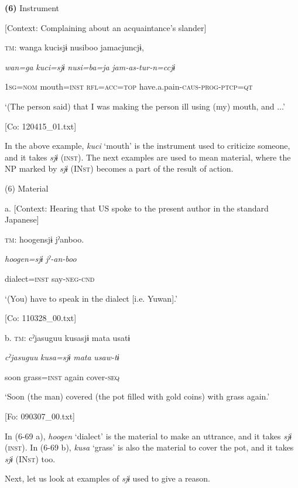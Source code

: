 \textbf{(6)}  Instrument

  [Context: Complaining about an acquaintance’s slander]

  \textsc{tm}:  wanga  kucisjɨ  nusiboo  jamacjuncjɨ,

    \textit{wan=ga}  \textit{kuci=sjɨ}  \textit{nusi=ba=ja}  \textit{jam-as-tur-n=ccjɨ}

    1\textsc{sg}=\textsc{nom}  mouth=\textsc{inst}  \textsc{rfl}=\textsc{acc}=\textsc{top}  have.a.pain-\textsc{caus}-\textsc{prog}-\textsc{ptcp}=\textsc{qt}

    ‘(The person\textit{\textsubscript{} }said) that I was making the person ill using (my) mouth, and ...’

    [Co: 120415\_01.txt]

In the above example, \textit{kuci} ‘mouth’ is the instrument used to criticize someone, and it takes \textit{sjɨ} (\textsc{inst}). The next examples are used to mean material, where the NP marked by \textit{sjɨ} (IN\textsc{st}) becomes a part of the result of action.

(6)  Material

  a.  [Context: Hearing that US spoke to the present author in the standard Japanese]

    \textsc{tm}:  {\textbar}hoogen{\textbar}sjɨ  jˀanboo.

      \textit{hoogen=sjɨ}  \textit{jˀ-an-boo}

      dialect=\textsc{inst}  say-\textsc{neg}-\textsc{cnd}

      ‘(You) have to speak in the dialect [i.e. Yuwan].’

      [Co: 110328\_00.txt]

  b.  \textsc{tm}:  cˀjasuguu  kusasjɨ  mata  usatɨ

      \textit{cˀjasuguu}  \textit{kusa=sjɨ}  \textit{mata}  \textit{usaw-tɨ}

      soon  grass=\textsc{inst}  again  cover-\textsc{seq}

      ‘Soon (the man) covered (the pot filled with gold coins) with grass again.’

      [Fo: 090307\_00.txt]

In (6-69 a), \textit{hoogen} ‘dialect’ is the material to make an uttrance, and it takes \textit{sjɨ} (\textsc{inst}). In (6-69 b), \textit{kusa} ‘grass’ is also the material to cover the pot, and it takes \textit{sjɨ} (IN\textsc{st}) too.

Next, let us look at examples of \textit{sjɨ} used to give a reason.

